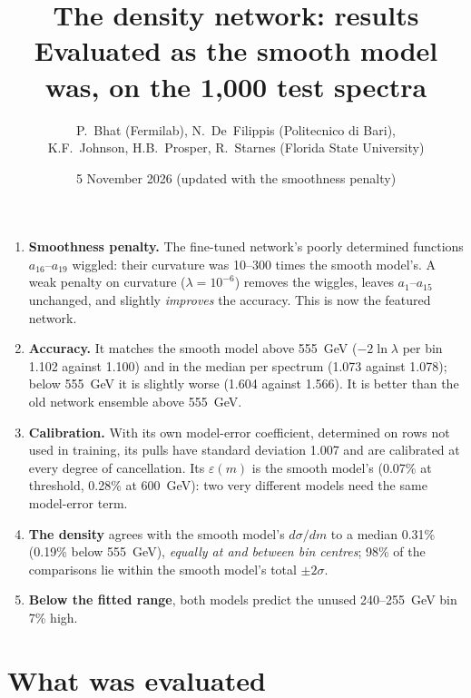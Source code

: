 \documentclass[11pt]{article}
\title{\textbf{The density network: results}\\[4pt]
\large Evaluated as the smooth model was, on the 1,000 test spectra}
\author{P.~Bhat (Fermilab), N.~De~Filippis (Politecnico di Bari),\\
K.F.~Johnson, H.B.~Prosper, R.~Starnes (Florida State University)}
\date{5 November 2026 (updated with the smoothness penalty)}
\begin{document}
\maketitle

\begin{keyidea}[In brief]
\begin{enumerate}
  \item \textbf{Smoothness penalty.} The fine-tuned network's poorly determined functions
    $a_{16}$--$a_{19}$ wiggled: their curvature was 10--300 times the smooth model's. A weak penalty
    on curvature ($\lambda = 10^{-6}$) removes the wiggles, leaves $a_1$--$a_{15}$ unchanged, and slightly
    \emph{improves} the accuracy. This is now the featured network.
  \item \textbf{Accuracy.} It matches the smooth model above 555~GeV ($-2\ln\lambda$ per bin 1.102
    against 1.100) and in the median per spectrum (1.073 against 1.078); below 555~GeV it is slightly
    worse (1.604 against 1.566). It is better than the old network ensemble above 555~GeV.
  \item \textbf{Calibration.} With its own model-error coefficient, determined on rows not used in
    training, its pulls have standard deviation 1.007 and are calibrated at every degree of
    cancellation. Its $\varepsilon(m)$ is the smooth model's (0.07\% at threshold, 0.28\% at 600~GeV):
    two very different models need the same model-error term.
  \item \textbf{The density} agrees with the smooth model's $d\sigma/dm$ to a median 0.31\% (0.19\% below
    555~GeV), \emph{equally at and between bin centres}; 98\% of the comparisons lie within the smooth
    model's total $\pm2\sigma$.
  \item \textbf{Below the fitted range}, both models predict the unused 240--255~GeV bin 7\% high.
\end{enumerate}
\end{keyidea}

\tableofcontents

\section{What was evaluated}
\end{document}
